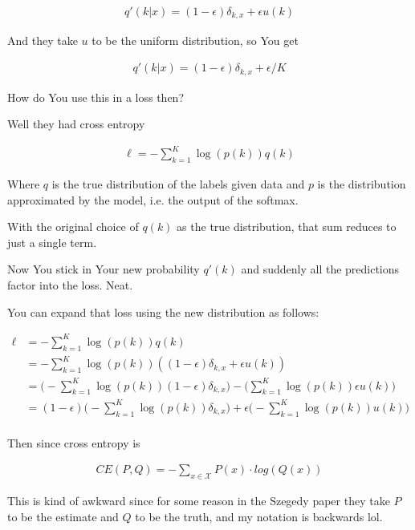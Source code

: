 \documentclass{article}
\begin{document}
		\begin{align}
			q'(k|x) = (1-\epsilon)\delta_{k, x} + \epsilon u(k)
		\end{align}
		
		And they take $u$ to be the uniform distribution, so You get 
		
		\begin{align}
			q'(k|x) = (1-\epsilon)\delta_{k, x} + \epsilon/K
		\end{align}
		
		How do You use this in a loss then?
		
		Well they had cross entropy
		
		\begin{align}
			\ell = -\sum^K_{k=1} \log(p(k))q(k)
		\end{align}
		
		Where $q$ is the true distribution of the labels given data and $p$ is the distribution approximated by the model, i.e. the output of the softmax.
		
		With the original choice of $q(k)$ as the true distribution, that sum reduces to just a single term. 
		
		Now You stick in Your new probability $q'(k)$ and suddenly all the predictions factor into the loss. Neat.
		
		You can expand that loss using the new distribution as follows:
		
		\begin{align}
			\ell &= -\sum^K_{k=1} \log(p(k))q(k)\\
			&= -\sum^K_{k=1} \log(p(k))((1-\epsilon)\delta_{k, x} + \epsilon u(k))\\
			&= \bigg(-\sum^K_{k=1} \log(p(k))(1-\epsilon)\delta_{k, x}\bigg) -\bigg(\sum^K_{k=1} \log(p(k)) \epsilon u(k)\bigg)\\
			&= (1-\epsilon)\bigg(-\sum^K_{k=1} \log(p(k))\delta_{k, x}\bigg) +\epsilon \bigg(-\sum^K_{k=1} \log(p(k))u(k) \bigg)\\
		\end{align}
		
		Then since cross entropy is
		
		\begin{align}
			CE(P, Q) = -\sum_{x\in\mathcal{X}} P(x)\cdot log(Q(x))
		\end{align}
		
		This is kind of awkward since for some reason in the Szegedy paper they take $P$ to be the estimate and $Q$ to be the truth, and my notation is backwards lol.
		
\end{document}
